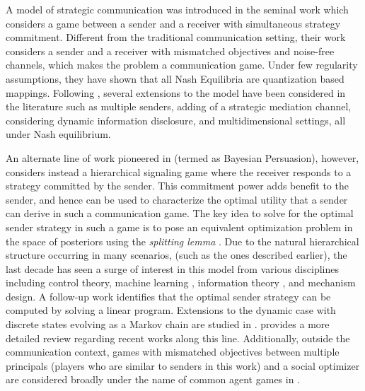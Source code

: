 \documentclass[12pt,journal,onecolumn]{IEEEtran}
\begin{document}
A model of strategic communication was introduced in the seminal work \cite{crawford1982strategic} which considers a game between a sender and a receiver with simultaneous strategy commitment. Different from the traditional communication setting, their work considers a sender and a receiver with mismatched objectives and noise-free channels, which makes the problem a communication game. Under few regularity assumptions, they have shown that all Nash Equilibria are quantization based mappings.
 Following \cite{crawford1982strategic}, several extensions to the model have been considered in the literature such as multiple senders\cite{ambrus2008multi,mcgee2013cheap}, adding of a strategic mediation channel\cite{ivanov2010communication}, considering dynamic information disclosure\cite{ivanov2015dynamic}, and multidimensional settings\cite{saritacs2016quadratic}, all under Nash equilibrium.%


An alternate line of work pioneered in \cite{kamenica2011bayesian,rayo2010optimal} (termed as Bayesian Persuasion), however, considers instead a hierarchical signaling game where the receiver responds to a strategy committed by the sender. This commitment power adds benefit to the sender, and hence can be used to characterize the optimal utility that a sender can derive in such a communication game. The key idea to solve for the optimal sender strategy in such a game is to pose an equivalent optimization problem in the space of posteriors using the \textit{splitting lemma} \cite{aumann1995repeated}. Due to the natural hierarchical structure occurring in many scenarios, (such as the ones described earlier), the last decade has seen a surge of interest in this model from various disciplines including control theory\cite{farokhi2016estimation,saritacs2016quadratic,saritacs2020dynamic}, machine learning \cite{chen2022selling}, information theory \cite{akyol2016information}, and mechanism design\cite{bergemann2019information}. %
A follow-up work \cite{dughmi2016algorithmic} identifies that the optimal sender strategy can be computed by solving a linear program. Extensions to the dynamic case with discrete states evolving as a Markov chain are studied in \cite{ely2017beeps,renault2017optimal}. \cite{kamenica2019bayesian} provides a more detailed review regarding recent works along this line. Additionally, outside the communication context, games with mismatched objectives between multiple principals (players who are similar to senders in this work) and a social optimizer are considered broadly under the name of common agent games in \cite{fickinger2020multi,martimort2002revelation}. 
\end{document}
